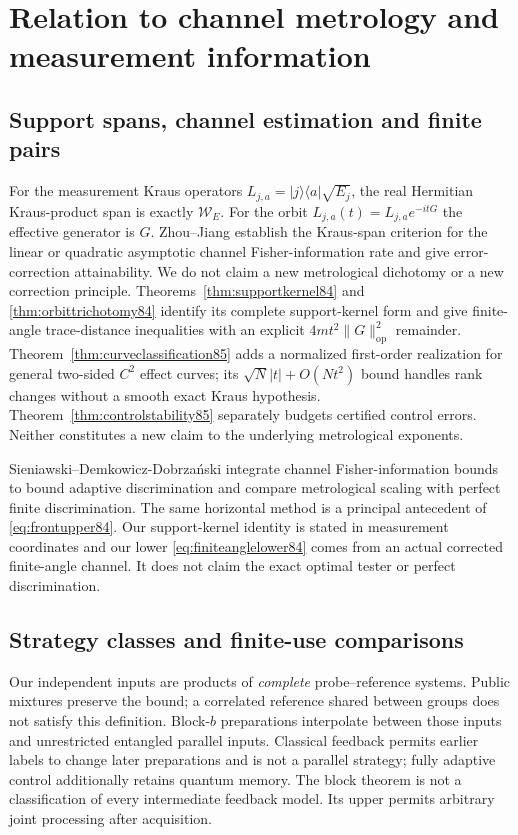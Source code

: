 \section{Relation to channel metrology and measurement information}
\label{sec:comparison84}

\subsection{Support spans, channel estimation and finite pairs}
For the measurement Kraus operators
$L_{j,a}=|j\rangle\langle a|\sqrt{E_j}$, the real Hermitian
Kraus-product span is exactly $\mathcal W_E$.  For the orbit
$L_{j,a}(t)=L_{j,a}e^{-itG}$ the effective generator is $G$.
Zhou--Jiang \cite[Theorems~1--3 and Section~V]{ZJ84} establish the
Kraus-span criterion for the linear or quadratic asymptotic channel
Fisher-information rate and give error-correction attainability.
We do not claim a new metrological dichotomy or a new correction
principle.  Theorems~\ref{thm:supportkernel84} and
\ref{thm:orbittrichotomy84} identify its complete support-kernel
form and give finite-angle trace-distance inequalities with an
explicit $4mt^2\|G\|_{\mathrm{op}}^2$ remainder.
Theorem~\ref{thm:curveclassification85} adds a normalized first-order
realization for general two-sided $C^2$ effect curves; its
$\sqrt N|t|+O(Nt^2)$ bound handles rank changes without a smooth
exact Kraus hypothesis.  Theorem~\ref{thm:controlstability85} separately
budgets certified control errors.  Neither constitutes a new claim
to the underlying metrological exponents.

Sieniawski--Demkowicz-Dobrza\'nski
\cite[Section~IV, equations~(16)--(23)]{SD76} integrate channel
Fisher-information bounds to bound adaptive discrimination and
compare metrological scaling with perfect finite discrimination.
The same horizontal method is a principal antecedent of
\eqref{eq:frontupper84}.  Our support-kernel identity is stated in
measurement coordinates and our lower \eqref{eq:finiteanglelower84}
comes from an actual corrected finite-angle channel.  It does not
claim the exact optimal tester or perfect discrimination.


\subsection{Strategy classes and finite-use comparisons}
Our independent inputs are products of \emph{complete} probe--reference
systems.  Public mixtures preserve the bound; a correlated reference
shared between groups does not satisfy this definition.  Block-$b$
preparations interpolate between those inputs and unrestricted
entangled parallel inputs.  Classical feedback permits earlier
labels to change later preparations and is not a parallel strategy;
fully adaptive control additionally retains quantum memory.  The
block theorem is not a classification of every intermediate feedback
model.  Its upper permits arbitrary joint processing after acquisition.


